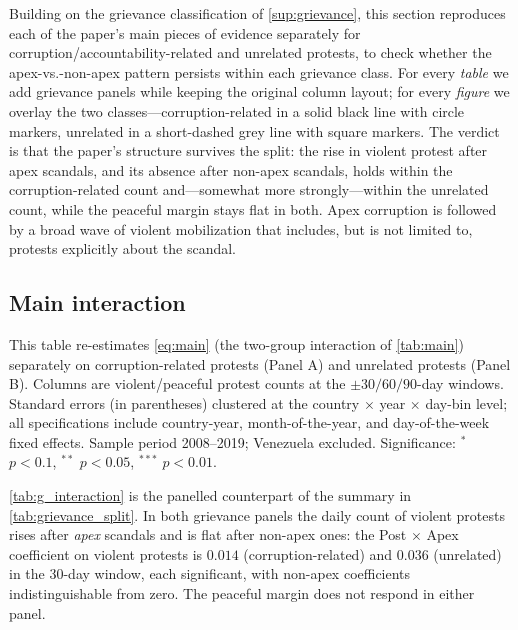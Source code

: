 \documentclass[11pt]{article}
\begin{document}
Building on the grievance classification of \autoref{sup:grievance}, this section reproduces each of the paper's main pieces of evidence separately for corruption/accountability-related and unrelated protests, to check whether the apex-vs.-non-apex pattern persists within each grievance class. For every \emph{table} we add grievance panels while keeping the original column layout; for every \emph{figure} we overlay the two classes---corruption-related in a solid black line with circle markers, unrelated in a short-dashed grey line with square markers. The verdict is that the paper's structure survives the split: the rise in violent protest after apex scandals, and its absence after non-apex scandals, holds within the corruption-related count and---somewhat more strongly---within the unrelated count, while the peaceful margin stays flat in both. Apex corruption is followed by a broad wave of violent mobilization that includes, but is not limited to, protests explicitly about the scandal.

\subsection{Main interaction}

\begin{table}[htb!]
    \caption{\autoref{tab:main} split by protest grievance.}
    \label{tab:g_interaction}
    \begin{center}
        \scriptsize{}
    \end{center}
    \footnotesize{This table re-estimates \autoref{eq:main} (the two-group interaction of \autoref{tab:main}) separately on corruption-related protests (Panel A) and unrelated protests (Panel B). Columns are violent/peaceful protest counts at the $\pm30/60/90$-day windows. Standard errors (in parentheses) clustered at the country $\times$ year $\times$ day-bin level; all specifications include country-year, month-of-the-year, and day-of-the-week fixed effects. Sample period 2008--2019; Venezuela excluded. Significance: $^{*}$ $p<0.1$, $^{**}$ $p<0.05$, $^{***}$ $p<0.01$.}
\end{table}

\autoref{tab:g_interaction} is the panelled counterpart of the summary in \autoref{tab:grievance_split}. In both grievance panels the daily count of violent protests rises after \emph{apex} scandals and is flat after non-apex ones: the Post $\times$ Apex coefficient on violent protests is $0.014$ (corruption-related) and $0.036$ (unrelated) in the 30-day window, each significant, with non-apex coefficients indistinguishable from zero. The peaceful margin does not respond in either panel.
\end{document}

